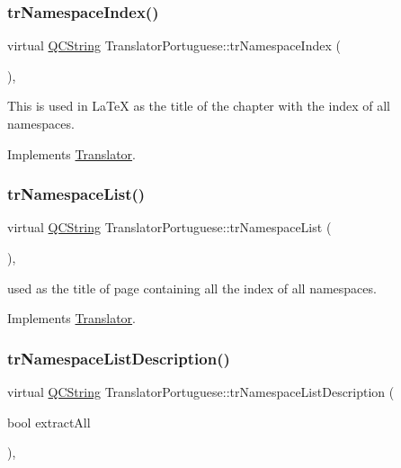 \subsubsection{\texorpdfstring{trNamespaceIndex()}{trNamespaceIndex()}}
{\footnotesize\ttfamily virtual \mbox{\hyperlink{class_q_c_string}{Q\+C\+String}} Translator\+Portuguese\+::tr\+Namespace\+Index (\begin{DoxyParamCaption}{ }\end{DoxyParamCaption})\hspace{0.3cm}{\ttfamily [inline]}, {\ttfamily [virtual]}}

This is used in La\+TeX as the title of the chapter with the index of all namespaces. 

Implements \mbox{\hyperlink{class_translator}{Translator}}.

\mbox{\label{class_translator_portuguese_a115ac84d17a0ef69c3312e70fbc37086}} 
\subsubsection{\texorpdfstring{trNamespaceList()}{trNamespaceList()}}
{\footnotesize\ttfamily virtual \mbox{\hyperlink{class_q_c_string}{Q\+C\+String}} Translator\+Portuguese\+::tr\+Namespace\+List (\begin{DoxyParamCaption}{ }\end{DoxyParamCaption})\hspace{0.3cm}{\ttfamily [inline]}, {\ttfamily [virtual]}}

used as the title of page containing all the index of all namespaces. 

Implements \mbox{\hyperlink{class_translator}{Translator}}.

\mbox{\label{class_translator_portuguese_a644d9d810439ea4a7a16f7cf5eee664c}} 
\subsubsection{\texorpdfstring{trNamespaceListDescription()}{trNamespaceListDescription()}}
{\footnotesize\ttfamily virtual \mbox{\hyperlink{class_q_c_string}{Q\+C\+String}} Translator\+Portuguese\+::tr\+Namespace\+List\+Description (\begin{DoxyParamCaption}\item[{bool}]{extract\+All }\end{DoxyParamCaption})\hspace{0.3cm}{\ttfamily [inline]}, {\ttfamily [virtual]}}

